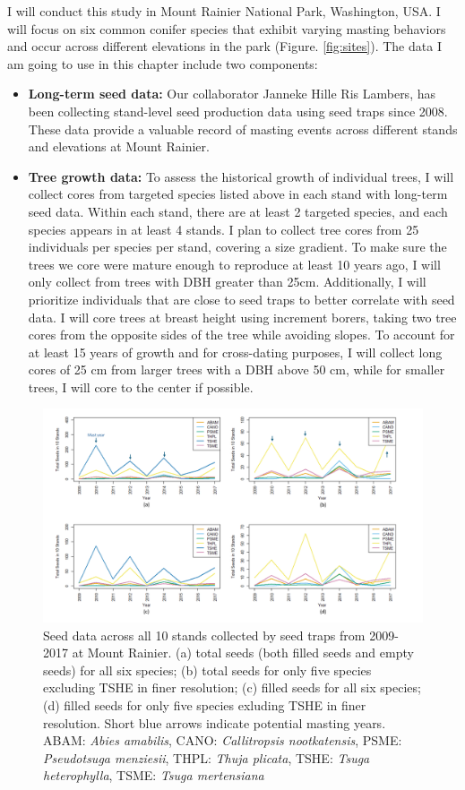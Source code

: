 \documentclass[11pt,letter]{article}
\begin{document}
I will conduct this study in Mount Rainier National Park, Washington, USA. I will focus on six common conifer species that exhibit varying masting behaviors and occur across different elevations in the park (Figure. \ref{fig:sites}). The data I am going to use in this chapter include two components:
\begin{itemize}
	\item \textbf{Long-term seed data:} Our collaborator Janneke Hille Ris Lambers, has been collecting stand-level seed production data using seed traps since 2008. These data provide a valuable record of masting events across different stands and elevations at Mount Rainier.
	\item \textbf{Tree growth data:}  To assess the historical growth of individual trees, I will collect cores from targeted species listed above in each stand with long-term seed data. Within each stand, there are at least 2 targeted species, and each species appears in at least 4 stands. I plan to collect tree cores from 25 individuals per species per stand, covering a size gradient. To make sure the trees we core were mature enough to reproduce at least 10 years ago, I will only collect from trees with DBH greater than 25cm. Additionally, I will prioritize individuals that are close to seed traps to better correlate with seed data. I will core trees at breast height using increment borers, taking two tree cores from the opposite sides of the tree while avoiding slopes. To account for at least 15 years of growth and for cross-dating purposes, I will collect long cores of 25 cm from larger trees with a DBH above 50 cm, while for smaller trees, I will core to the center if possible.
	\end{itemize}
\begin{figure}[htb]
	\centering
	\includegraphics[width=1\linewidth]{seed.png}
	\caption{Seed data across all 10 stands collected by seed traps from 2009-2017 at Mount Rainier. (a) total seeds (both filled seeds and empty seeds) for all six species; (b) total seeds for only five species excluding TSHE in finer resolution; (c) filled seeds for all six species; (d) filled seeds for only five species exluding TSHE in finer resolution. Short blue arrows indicate potential masting years. ABAM: \textit{Abies amabilis}, CANO:  \textit{Callitropsis nootkatensis}, PSME: \textit{Pseudotsuga menziesii}, THPL: \textit{Thuja plicata}, TSHE: \textit{Tsuga heterophylla}, TSME: \textit{Tsuga mertensiana}}
	\label{fig:seed}
\end{figure}	
\end{document}
